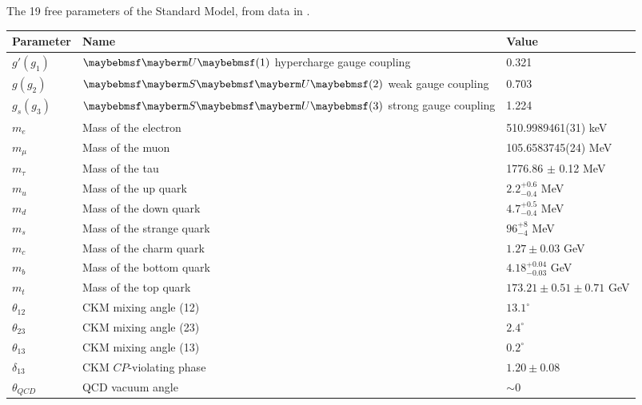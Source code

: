 \begin{threeparttable}
	\centering
	\caption[The 19 free parameters of the Standard Model.]{The 19 free parameters of the Standard Model, from data in \cite{RN496}.}
	\label{tab:SMparam}
	\begin{tabular}{|l|l|l|}
		\hline
		Parameter & Name & Value\tnote{\textdagger} \\ \hline
		$g' (g_1)$   & $\Ugroup{1}$ hypercharge gauge coupling         & 0.321       	\\ \hline
		$g (g_2)$    & $\SUgroup{2}$ weak gauge coupling               & 0.703       	\\ \hline
		$g_s (g_3)$  & $\SUgroup{3}$ strong gauge coupling             & 1.224	\\ \hline
		$m_e$        & Mass of the electron                            & 510.9989461(31) keV 	\\ \hline
		$m_{\mu}$    & Mass of the muon                            & 105.6583745(24) MeV  	\\ \hline
		$m_{\tau}$   & Mass of the tau                            & 1776.86 $\pm$ 0.12 MeV  \\ \hline
		$m_{u}$        & Mass of the up quark                          & $2.2^{+0.6}_{-0.4}$ MeV \\ \hline
		$m_{d}$        & Mass of the down quark                       & $4.7^{+0.5}_{-0.4}$ MeV \\ \hline
		$m_{s}$        & Mass of the strange quark                      & $96^{+8}_{-4}$ MeV \\ \hline
		$m_{c}$        & Mass of the charm quark                     & $1.27 \pm 0.03$ GeV \\ \hline
		$m_{b}$        & Mass of the bottom quark                   & $4.18^{+0.04}_{-0.03}$ GeV \\ \hline
		$m_{t}$        & Mass of the top quark                   & $173.21 \pm 0.51 \pm 0.71$ GeV \\ \hline
		$\theta_{12}$        & CKM mixing angle (12)                      & $13.1^{\circ}$ \\ \hline
		$\theta_{23}$        & CKM mixing angle (23)                      & $2.4^{\circ}$ \\ \hline
		$\theta_{13}$        & CKM mixing angle (13)                      & $0.2^{\circ}$ \\ \hline
		$\delta_{13}$        & CKM $CP$-violating phase                      &  $1.20 \pm 0.08$ \\ \hline
		$\theta_{QCD}$        & QCD vacuum angle                 &  $\sim 0$ \tnote{$\ddag$} \\ \hline

\end{tabular}
\end{threeparttable}
